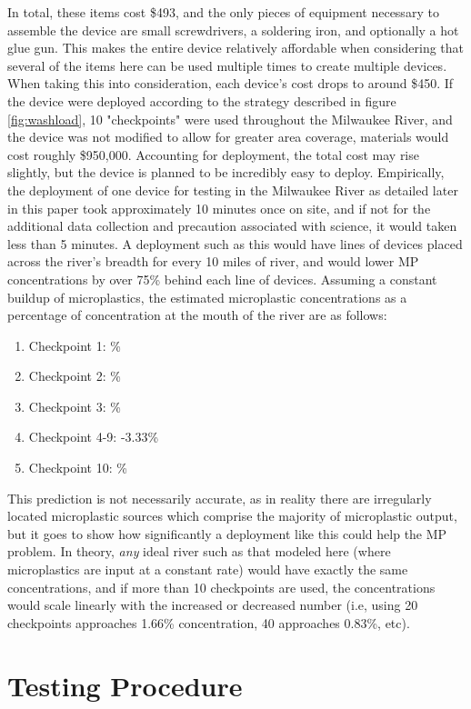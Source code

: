 \documentclass[fleqn,10pt]{SelfArx} %
\begin{document}
	In total, these items cost \$493, and the only pieces of equipment necessary to assemble the device are small screwdrivers, a soldering iron, and optionally a hot glue gun. This makes the entire device relatively affordable when considering that several of the items here can be used multiple times to create multiple devices. When taking this into consideration, each device's cost drops to around \$450. If the device were deployed according to the strategy described in figure \ref{fig:washload}, 10 "checkpoints" were used throughout the Milwaukee River, and the device was not modified to allow for greater area coverage, materials would cost roughly \$950,000. Accounting for deployment, the total cost may rise slightly, but the device is planned to be incredibly easy to deploy. Empirically, the deployment of one device for testing in the Milwaukee River as detailed later in this paper took approximately 10 minutes once on site, and if not for the additional data collection and precaution associated with science, it would taken less than 5 minutes. A deployment such as this would have lines of devices placed across the river's breadth for every 10 miles of river, and would lower MP concentrations by over 75\% behind each line of devices. Assuming a constant buildup of microplastics, the estimated microplastic concentrations as a percentage of concentration at the mouth of the river are as follows:
	\begin{enumerate}
		\label{checkpointPredictions}
		\item Checkpoint 1:
		\%
		\item Checkpoint 2:
		\%
		\item Checkpoint 3:
		\%
		\item Checkpoint 4-9:
		-3.33\%
		\item Checkpoint 10:
		\%
	\end{enumerate}
	This prediction is not necessarily accurate, as in reality there are irregularly located microplastic sources which comprise the majority of microplastic output, but it goes to show how significantly a deployment like this could help the MP problem. In theory, \textit{any} ideal river such as that modeled here (where microplastics are input at a constant rate) would have exactly the same concentrations, and if more than 10 checkpoints are used, the concentrations would scale linearly with the increased or decreased number (i.e, using 20 checkpoints approaches 1.66\% concentration, 40 approaches 0.83\%, etc).
	\section{Testing Procedure}
\end{document}
